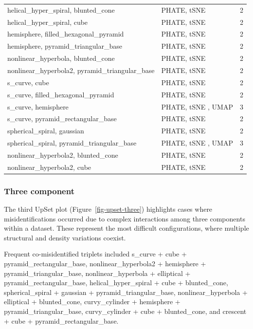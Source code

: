 \documentclass[
  11pt,
  a4paper,
]{report}
\begin{document}
\begin{table}
{\begin{tabular}{llr}
helical\_hyper\_spiral, blunted\_cone & PHATE, tSNE & 2\\
helical\_hyper\_spiral, cube & PHATE, tSNE & 2\\
hemisphere, filled\_hexagonal\_pyramid & PHATE, tSNE & 2\\
hemisphere, pyramid\_triangular\_base & PHATE, tSNE & 2\\
nonlinear\_hyperbola, blunted\_cone & PHATE, tSNE & 2\\
nonlinear\_hyperbola2, pyramid\_triangular\_base & PHATE, tSNE & 2\\
s\_curve, cube & PHATE, tSNE & 2\\
s\_curve, filled\_hexagonal\_pyramid & PHATE, tSNE & 2\\
s\_curve, hemisphere & PHATE, tSNE , UMAP & 3\\
s\_curve, pyramid\_rectangular\_base & PHATE, tSNE & 2\\
spherical\_spiral, gaussian & PHATE, tSNE & 2\\
spherical\_spiral, pyramid\_triangular\_base & PHATE, tSNE , UMAP & 3\\
nonlinear\_hyperbola2, blunted\_cone & PHATE, tSNE & 2\\
nonlinear\_hyperbola2, cube & PHATE, tSNE & 2\\
\bottomrule
\end{tabular}}
\end{table}

\subsubsection{Three component}\label{three-component}

The third UpSet plot (Figure~\ref{fig-upset-three}) highlights cases
where misidentifications occurred due to complex interactions among
three components within a dataset. These represent the most difficult
configurations, where multiple structural and density variations
coexist.

Frequent co-misidentified triplets included s\_curve + cube +
pyramid\_rectangular\_base, nonlinear\_hyperbola2 + hemisphere +
pyramid\_triangular\_base, nonlinear\_hyperbola + elliptical +
pyramid\_rectangular\_base, helical\_hyper\_spiral + cube +
blunted\_cone, spherical\_spiral + gaussian + pyramid\_triangular\_base,
nonlinear\_hyperbola + elliptical + blunted\_cone, curvy\_cylinder +
hemisphere + pyramid\_triangular\_base, curvy\_cylinder + cube +
blunted\_cone, and crescent + cube + pyramid\_rectangular\_base.
\end{document}

